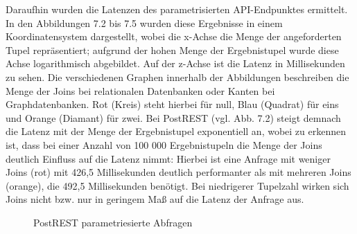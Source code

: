 \noindent
Daraufhin wurden die Latenzen des parametrisierten API-Endpunktes ermittelt. In den Abbildungen 7.2 bis 7.5 wurden diese Ergebnisse in einem Koordinatensystem dargestellt, wobei die x-Achse die Menge der angeforderten Tupel repräsentiert; aufgrund der hohen Menge der Ergebnistupel wurde diese Achse logarithmisch abgebildet. Auf der z-Achse ist die Latenz in Millisekunden zu sehen. Die verschiedenen Graphen innerhalb der Abbildungen beschreiben die Menge der Joins bei relationalen Datenbanken oder Kanten bei Graphdatenbanken. Rot (Kreis) steht hierbei für null, Blau (Quadrat) für eins und Orange (Diamant) für zwei.
\newline
Bei PostREST (vgl. Abb. 7.2) steigt demnach die Latenz mit der Menge der Ergebnistupel exponentiell an, wobei zu erkennen ist, dass bei einer Anzahl von 100 000 Ergebnistupeln die Menge der Joins deutlich Einfluss auf die Latenz nimmt: Hierbei ist eine Anfrage mit weniger Joins (rot) mit 426,5 Millisekunden deutlich performanter als mit mehreren Joins (orange), die 492,5 Millisekunden benötigt. Bei niedrigerer Tupelzahl wirken sich Joins nicht bzw. nur in geringem Maß auf die Latenz der Anfrage aus.
\newline
\begin{figure}[H]
\centering
{}
\caption{PostREST parametriesierte Abfragen}
\end{figure}
